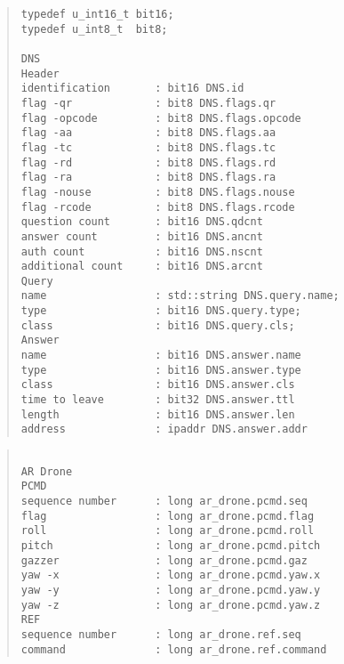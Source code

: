 \documentclass[12pt]{jsarticle}
\begin{document}
\begin{quote}
\begin{verbatim}
typedef u_int16_t bit16;
typedef u_int8_t  bit8;

DNS
Header
identification       : bit16 DNS.id
flag -qr             : bit8 DNS.flags.qr
flag -opcode         : bit8 DNS.flags.opcode
flag -aa             : bit8 DNS.flags.aa
flag -tc             : bit8 DNS.flags.tc
flag -rd             : bit8 DNS.flags.rd
flag -ra             : bit8 DNS.flags.ra
flag -nouse          : bit8 DNS.flags.nouse
flag -rcode          : bit8 DNS.flags.rcode
question count       : bit16 DNS.qdcnt
answer count         : bit16 DNS.ancnt
auth count           : bit16 DNS.nscnt
additional count     : bit16 DNS.arcnt
Query
name                 : std::string DNS.query.name;
type                 : bit16 DNS.query.type;
class                : bit16 DNS.query.cls;
Answer
name                 : bit16 DNS.answer.name
type                 : bit16 DNS.answer.type
class                : bit16 DNS.answer.cls
time to leave        : bit32 DNS.answer.ttl
length               : bit16 DNS.answer.len
address              : ipaddr DNS.answer.addr

\end{verbatim}
\end{quote}

\newpage

\begin{quote}
\begin{verbatim}

AR Drone
PCMD
sequence number      : long ar_drone.pcmd.seq
flag                 : long ar_drone.pcmd.flag
roll                 : long ar_drone.pcmd.roll
pitch                : long ar_drone.pcmd.pitch
gazzer               : long ar_drone.pcmd.gaz
yaw -x               : long ar_drone.pcmd.yaw.x
yaw -y               : long ar_drone.pcmd.yaw.y
yaw	-z               : long ar_drone.pcmd.yaw.z
REF
sequence number      : long ar_drone.ref.seq
command              : long ar_drone.ref.command

\end{verbatim}
\end{quote}
\end{document}
